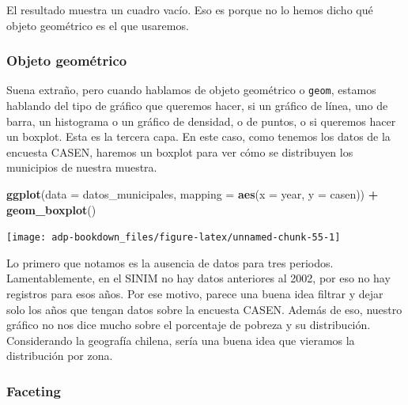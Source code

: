 \documentclass[]{book}
\newenvironment{Shaded}{\begin{snugshade}}{\end{snugshade}}
\newcommand{\DataTypeTok}[1]{\textcolor[rgb]{0.13,0.29,0.53}{#1}}
\newcommand{\KeywordTok}[1]{\textcolor[rgb]{0.13,0.29,0.53}{\textbf{#1}}}
\newcommand{\NormalTok}[1]{#1}
\newcommand{\OperatorTok}[1]{\textcolor[rgb]{0.81,0.36,0.00}{\textbf{#1}}}
\newcommand{\StringTok}[1]{\textcolor[rgb]{0.31,0.60,0.02}{#1}}
\begin{document}
El resultado muestra un cuadro vacío. Eso es porque no lo hemos dicho
qué objeto geométrico es el que usaremos.

\hypertarget{objeto-geometrico}{%
\subsubsection{Objeto geométrico}\label{objeto-geometrico}}

Suena extraño, pero cuando hablamos de objeto geométrico o
\texttt{geom}, estamos hablando del tipo de gráfico que queremos hacer,
si un gráfico de línea, uno de barra, un histograma o un gráfico de
densidad, o de puntos, o si queremos hacer un boxplot. Esta es la
tercera capa. En este caso, como tenemos los datos de la encuesta CASEN,
haremos un boxplot para ver cómo se distribuyen los municipios de
nuestra muestra.

\begin{Shaded}
\begin{Highlighting}[]
\KeywordTok{ggplot}\NormalTok{(}\DataTypeTok{data    =}\NormalTok{ datos_municipales, }
       \DataTypeTok{mapping =} \KeywordTok{aes}\NormalTok{(}\DataTypeTok{x =}\NormalTok{ year, }\DataTypeTok{y =}\NormalTok{ casen)) }\OperatorTok{+}
\StringTok{  }\KeywordTok{geom_boxplot}\NormalTok{()}
\end{Highlighting}
\end{Shaded}

\begin{center}\texttt{[image: adp-bookdown\_files/figure-latex/unnamed-chunk-55-1]} \end{center}

Lo primero que notamos es la ausencia de datos para tres periodos.
Lamentablemente, en el SINIM no hay datos anteriores al 2002, por eso no
hay registros para esos años. Por ese motivo, parece una buena idea
filtrar y dejar solo los años que tengan datos sobre la encuesta CASEN.
Además de eso, nuestro gráfico no nos dice mucho sobre el porcentaje de
pobreza y su distribución. Considerando la geografía chilena, sería una
buena idea que vieramos la distribución por zona.

\hypertarget{faceting}{%
\subsubsection{Faceting}\label{faceting}}
\end{document}
